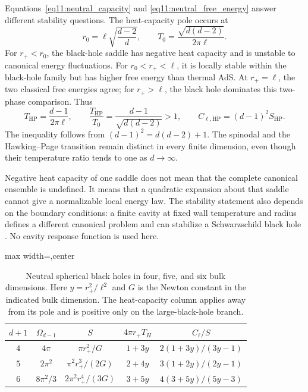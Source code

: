 \documentclass[11pt,letterpaper]{article}
\theoremstyle{plain}
\theoremstyle{definition}
\theoremstyle{remark}
\begin{document}
Equations~\eqref{eq11:neutral_capacity} and
\eqref{eq11:neutral_free_energy} answer different stability questions.
The heat-capacity pole occurs at
\begin{equation}
 r_0=\ell\sqrt{\frac{d-2}{d}},\qquad
 T_0=\frac{\sqrt{d(d-2)}}{2\pi\ell}.
 \label{eq11:neutral_minimum}
\end{equation}
For $r_+<r_0$, the black-hole saddle has negative heat capacity and is
unstable to canonical energy fluctuations.  For $r_0<r_+<\ell$, it is
locally stable within the black-hole family but has higher free energy
than thermal AdS.  At $r_+=\ell$, the two classical free energies agree;
for $r_+>\ell$, the black hole dominates this two-phase comparison.
Thus
\begin{equation}
 T_{\mathrm{HP}}=\frac{d-1}{2\pi\ell},\qquad
 \frac{T_{\mathrm{HP}}}{T_0}
 =\frac{d-1}{\sqrt{d(d-2)}}>1,\qquad
 C_{\ell,\mathrm{HP}}=(d-1)^2S_{\mathrm{HP}}.
 \label{eq11:neutral_hp}
\end{equation}
The inequality follows from $(d-1)^2=d(d-2)+1$.
The spinodal and the Hawking--Page transition remain distinct in every
finite dimension, even though their temperature ratio tends to one as
$d\to\infty$.

Negative heat capacity of one saddle does not mean that the complete
canonical ensemble is undefined.  It means that a quadratic expansion
about that saddle cannot give a normalizable local energy law.  The
stability statement also depends on the boundary conditions: a finite
cavity at fixed wall temperature and radius defines a different
canonical problem and can stabilize a Schwarzschild black hole
\cite{york1986}.  No cavity response function is used here.

\begin{table}[tbp]
 \centering
 \caption{Neutral spherical black holes in four, five, and six bulk
 dimensions.  Here $y=r_+^2/\ell^2$ and $G$ is the Newton constant in the
 indicated bulk dimension.  The heat-capacity column applies away from
 its pole and is positive only on the large-black-hole branch.}
 \label{tab11:neutral_dimensions}
 \begin{adjustbox}{max width=\textwidth,center}
 \begin{tabular}{@{}ccccc@{}}
 \toprule
 $d+1$ & $\Omega_{d-1}$ & $S$ & $4\pi r_+T_H$ & $C_\ell/S$\\
 \midrule
 $4$ & $4\pi$ & $\pi r_+^2/G$ & $1+3y$
     & $2(1+3y)/(3y-1)$\\[3pt]
 $5$ & $2\pi^2$ & $\pi^2r_+^3/(2G)$ & $2+4y$
     & $3(1+2y)/(2y-1)$\\[3pt]
 $6$ & $8\pi^2/3$ & $2\pi^2r_+^4/(3G)$ & $3+5y$
     & $4(3+5y)/(5y-3)$\\
 \bottomrule
 \end{tabular}
 \end{adjustbox}
\end{table}
\end{document}
